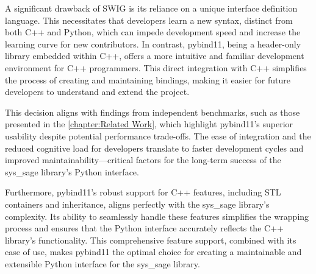 A significant drawback of SWIG is its reliance on a unique interface definition language. This necessitates that developers learn a new syntax, distinct from both C++ and Python, which can impede development speed and increase the learning curve for new contributors. In contrast, pybind11, being a header-only library embedded within C++, offers a more intuitive and familiar development environment for C++ programmers. This direct integration with C++ simplifies the process of creating and maintaining bindings, making it easier for future developers to understand and extend the project.

This decision aligns with findings from independent benchmarks, such as those presented in the \autoref{chapter:Related Work}, which highlight pybind11's superior usability despite potential performance trade-offs. The ease of integration and the reduced cognitive load for developers translate to faster development cycles and improved maintainability—critical factors for the long-term success of the sys\_sage library's Python interface.

Furthermore, pybind11's robust support for C++ features, including \ac{STL} containers and inheritance, aligns perfectly with the sys\_sage library's complexity. Its ability to seamlessly handle these features simplifies the wrapping process and ensures that the Python interface accurately reflects the C++ library's functionality. This comprehensive feature support, combined with its ease of use, makes pybind11 the optimal choice for creating a maintainable and extensible Python interface for the sys\_sage library.